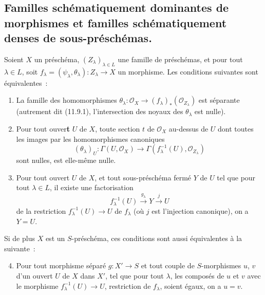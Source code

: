 \subsection{Familles schématiquement dominantes de morphismes et familles
schématiquement denses de sous-préschémas.}
\label{subsection:IV.11.10-fr}

\begin{proposition}[11.10.1]
\label{IV.11.10.1-fr}
Soient $X$ un préschéma, $(Z_\lambda)_{\lambda\in L}$ une famille de
préschémas, et pour tout $\lambda\in L$, soit
$f_\lambda=(\psi_\lambda,\theta_\lambda):Z_\lambda\to X$ un morphisme. Les
conditions suivantes sont équivalentes~:
\begin{enumerate}[label=\emph{\alph*)}]
  \item La famille des homomorphismes
  $\theta_\lambda:\mathcal O_X\to(f_\lambda)_*(\mathcal O_{Z_\lambda})$ est
  séparante \textup{(autrement dit (11.9.1), l'intersection des noyaux des
  $\theta_\lambda$ est} nulle\textup{)}.
  \item Pour tout ouver\textbf{t} $U$ de $X$, toute section $t$ de $\mathcal O_X$
  au-dessus de $U$ dont toutes les images par les homomorphismes canoniques
  \[
  (\theta_\lambda)_U:\Gamma(U,\mathcal O_X)
  \longrightarrow\Gamma(f_\lambda^{-1}(U),\mathcal O_{Z_\lambda})
  \tag{11.10.1.1}
  \label{IV.11.10.1.1-fr}
  \]
  sont nulles, est elle-même nulle.
  \item Pour tout ouvert $U$ de $X$, et tout sous-préschéma fermé $Y$ de $U$
  tel que pour tout $\lambda\in L$, il existe une factorisation
  \[
  f_\lambda^{-1}(U)\xrightarrow{g_\lambda}Y\xrightarrow{j}U
  \tag{11.10.1.2}
  \label{IV.11.10.1.2-fr}
  \]
  de la restriction $f_\lambda^{-1}(U)\to U$ de $f_\lambda$ \textup{(où $j$ est
  l'injection canonique)}, on a $Y=U$.
\end{enumerate}

Si de plus $X$ est un $S$-préschéma, ces conditions sont aussi équivalentes à
la suivante~:
\begin{enumerate}[label=\emph{\alph*)}]
\setcounter{enumi}{3}
  \item Pour tout morphisme séparé $g:X'\to S$ et tout couple de
  $S$-morphismes $u$, $v$ d'un ouvert $U$ de $X$ dans $X'$, tel que pour tout
  $\lambda$, les composés de $u$ et $v$ avec le morphisme
  $f_\lambda^{-1}(U)\to U$, restriction de $f_\lambda$, soient égaux, on a
  $u=v$.
\end{enumerate}
\end{proposition}

